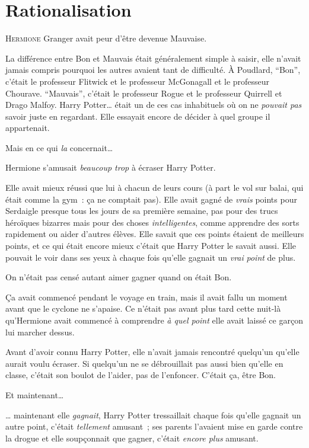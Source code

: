 \chapter{Rationalisation}

\lettrine{H}{ermione} Granger avait peur d'être devenue Mauvaise.

\hplettrineextrapara
La différence entre Bon et Mauvais était généralement simple à saisir, elle n'avait jamais compris pourquoi les autres avaient tant de difficulté.
À Poudlard, “Bon”, c'était le professeur Flitwick et le professeur McGonagall et le professeur Chourave.
“Mauvais”, c'était le professeur Rogue et le professeur Quirrell et Drago Malfoy.
Harry Potter… était un de ces cas inhabituels où on ne \emph{pouvait pas} savoir juste en regardant.
Elle essayait encore de décider à quel groupe il appartenait.

Mais en ce qui \emph{la} concernait…

Hermione s'amusait \emph{beaucoup trop} à écraser Harry Potter.

Elle avait mieux réussi que lui à chacun de leurs cours (à part le vol sur balai, qui était comme la gym~: ça ne comptait pas).
Elle avait gagné de \emph{vrais} points pour Serdaigle presque tous les jours de sa première semaine, pas pour des trucs héroïques bizarres mais pour des choses \emph{intelligentes}, comme apprendre des sorts rapidement ou aider d'autres élèves.
Elle savait que ces points étaient de meilleurs points, et ce qui était encore mieux c'était que Harry Potter le savait aussi.
Elle pouvait le voir dans ses yeux à chaque fois qu'elle gagnait un \emph{vrai} \emph{point} de plus.

On n'était pas censé autant aimer gagner quand on était Bon.

Ça avait commencé pendant le voyage en train, mais il avait fallu un moment avant que le cyclone ne s'apaise.
Ce n'était pas avant plus tard cette nuit-là qu'Hermione avait commencé à comprendre \emph{à quel point} elle avait laissé ce garçon lui marcher dessus.

Avant d'avoir connu Harry Potter, elle n'avait jamais rencontré quelqu'un qu'elle aurait voulu écraser.
Si quelqu'un ne se débrouillait pas aussi bien qu'elle en classe, c'était son boulot de l'aider, pas de l'enfoncer.
C'était ça, être Bon.

Et maintenant…

… maintenant elle \emph{gagnait}, Harry Potter tressaillait chaque fois qu'elle gagnait un autre point, c'était \emph{tellement} amusant~; ses parents l'avaient mise en garde contre la drogue et elle soupçonnait que gagner, c'était \emph{encore plus} amusant.

